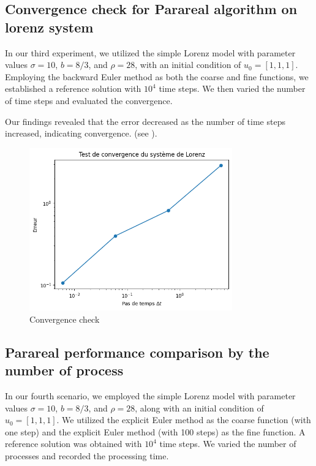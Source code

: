 \documentclass[a4paper,12pt,french]{article}
\begin{document}
\subsection{Convergence check for Parareal algorithm on lorenz system}
In our third experiment, we utilized the simple Lorenz model with parameter values \(\sigma = 10\), \(b = 8/3\), and \(\rho = 28\), with an initial condition of \(u_0=[1, 1, 1]\). Employing the backward Euler method as both the coarse and fine functions, we established a reference solution with \(10^4\) time steps. We then varied the number of time steps and evaluated the convergence.

Our findings revealed that the error decreased as the number of time steps increased, indicating convergence. (see ).
\begin{figure}[ht!]
    \centering
    \includegraphics[width=0.78\textwidth]{img/cv.png}
    \caption{Convergence check}
    \label{fig:5}
\end{figure}
\newpage
\subsection{Parareal performance comparison by the number of process}
In our fourth scenario, we employed the simple Lorenz model with parameter values \(\sigma = 10\), \(b = 8/3\), and \(\rho = 28\), along with an initial condition of \(u_0=[1, 1, 1]\). We utilized the explicit Euler method as the coarse function (with one step) and the explicit Euler method (with 100 steps) as the fine function. A reference solution was obtained with \(10^4\) time steps. We varied the number of processes and recorded the processing time.
\end{document}
